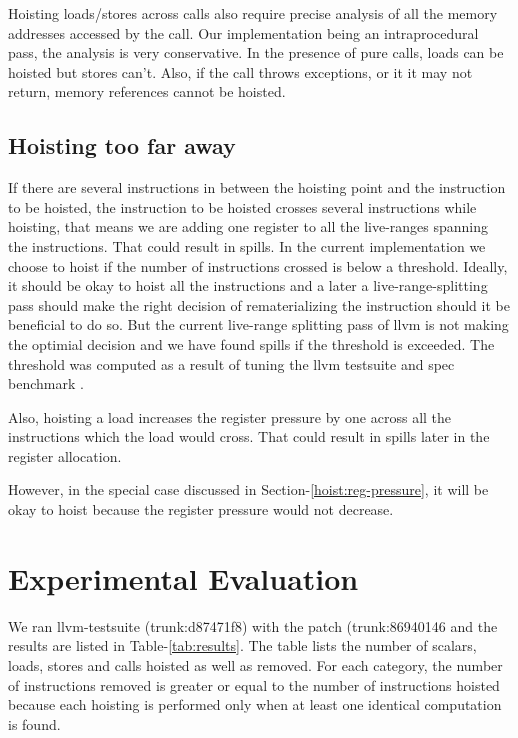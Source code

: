 \documentclass{sig-alternate}
\begin{document}
Hoisting loads/stores across calls also require precise analysis of all the
memory addresses accessed by the call. Our implementation being an
intraprocedural pass, the analysis is very conservative. In the presence of pure
calls, loads can be hoisted but stores can't. Also, if the call throws
exceptions, or it it may not return, memory references cannot be hoisted.

\subsection{Hoisting too far away}
If there are several instructions in between the hoisting point and the
instruction to be hoisted, the instruction to be hoisted crosses several
instructions while hoisting, that means we are adding one register to all the
live-ranges spanning the instructions. That could result in spills. In the
current implementation we choose to hoist if the number of instructions crossed
is below a threshold. Ideally, it should be okay to hoist all the instructions
and a later a live-range-splitting \cite{cooper1998live} pass should make the
right decision of rematerializing the instruction should it be beneficial to do
so. But the current live-range splitting pass of llvm is not making the optimial
decision and we have found spills if the threshold is exceeded. The threshold
was computed as a result of tuning the llvm testsuite \cite{llvm-nightly} and
spec benchmark \cite{Henning2000}.

Also, hoisting a load increases the register pressure by one across all the
instructions which the load would cross. That could result in spills later in
the register allocation.

However, in the special case discussed in Section-\ref{hoist:reg-pressure}, it
will be okay to hoist because the register pressure would not decrease.


\newpage

\section{Experimental Evaluation}
\label{sec:experimental-results}
We ran llvm-testsuite (trunk:d87471f8) with the patch (trunk:86940146 and the
results are listed in Table-\ref{tab:results}. The table lists the number of
scalars, loads, stores and calls hoisted as well as removed. For each category,
the number of instructions removed is greater or equal to the number of
instructions hoisted because each hoisting is performed only when at least one
identical computation is found.
\end{document}
